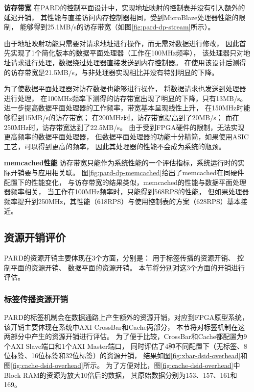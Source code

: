 \textbf{访存带宽}\quad
在PARD的控制平面设计中，实现地址映射的控制表并没有引入额外的延迟开销，
其性能与直接访问内存控制器相同，受到MicroBlaze处理器性能的限制，
能够得到25.1MB/s的访存带宽（如图\ref{fig:pard-dp-stream}所示）。

由于地址映射功能只需要对请求地址进行操作，而无需对数据进行修改，
因此首先实现了1个简化版本的数据平面处理器（工作在100MHz频率），
该处理器只对地址请求进行处理，数据绕过处理器直接发送到内存控制器。
在使用该设计后测得的访存带宽是21.5MB/s，与非处理器实现相比并没有特别明显的下降。

为了使数据平面处理器对访存数据也能够进行操作，
将数据请求也发送到处理器进行处理，
在100MHz频率下测得的访存带宽出现了明显的下降，只有13MB/s。
进一步提高数据平面处理器的工作频率，带宽基本呈现线性上升，
在150MHz时能够得到15MB/s的访存带宽；
在200MHz时，访存带宽提高到了20MB/s；
而在250MHz时，访存带宽达到了22.5MB/s。
由于受到FPGA硬件的限制，无法实现更高频率的数据平面处理器，
但数据平面处理器的功能十分精简，如果使用ASIC工艺，可以得到更高的频率，
因此其处理器的性能不会成为系统的瓶颈。

\textbf{memcached性能}\quad
访存带宽只能作为系统性能的一个评估指标，系统运行时的实际开销要与应用相关联。
图\ref{fig:pard-dp-memcached}给出了memcached在同硬件配置下的性能变化，
与访存带宽的结果类似，memcached的性能与数据平面处理器频率相关，
当工作在100MHz频率时，只能得到568RPS的性能，
但如果处理器频率提升到250MHz，其性能（618RPS）与使用控制表的方案（628RPS）基本接近。


\subsection{资源开销评价}

PARD的资源开销主要体现在3个方面，分别是：
用于标签传播的资源开销、
控制平面的资源开销、
数据平面的资源开销。
本节将分别对这3个方面的开销进行评估。

\subsubsection{标签传播资源开销}

PARD的标签机制会在数据通路上产生额外的资源开销，对应到FPGA原型系统，
该开销主要体现在系统中AXI CrossBar和Cache两部分，
本节将对标签机制在这两部分中产生的资源开销进行评估。
为了便于比较，CrossBar和Cache都配置为9个AXI Slave端口和1个AXI Master端口，
同时评估了4种不同配置下（无标签、8位标签、16位标签和32位标签）的资源开销，
结果如图\ref{fig:xbar-dsid-overhead}和图\ref{fig:cache-dsid-overhead}所示。
为了方便对比，图\ref{fig:cache-dsid-overhead}中Block RAM的资源为放大10倍后的数据，
其原始数据分别为153、157、161和169。

